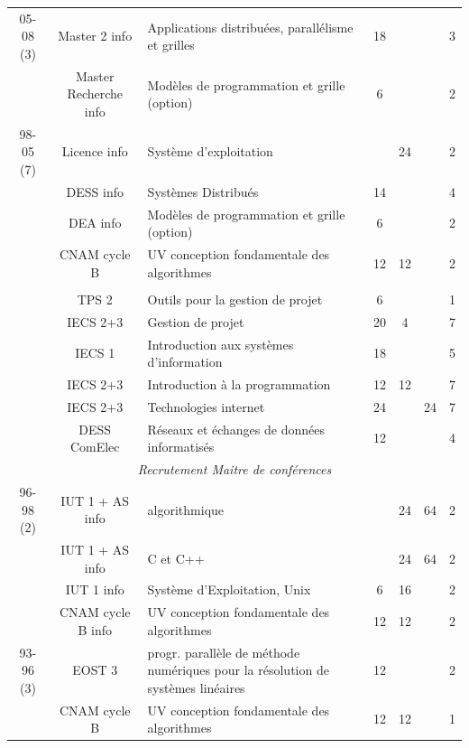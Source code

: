 \documentclass[11pt]{article}
\begin{document}
\begin{table}[H]
\begin{center}
{\begin{tabular}{|c|c|p{6cm}|c|c|c|c|}
\hline
05-08 (3)
	& Master 2 info		& Applications distribuées, parallélisme et grilles	&  18	& & & 3 \\
	& Master Recherche info	& Modèles de programmation et grille (option) 		& 6	& & & 2 \\
\hline
 98-05 (7)
      & Licence info  & Système d'exploitation 	&  	& 24 & 	& 2 \\
	& DESS info	& Systèmes Distribués		& 14	&    &	& 4 \\
	& DEA info	& Modèles de programmation et grille (option) & 6	&    &	& 2 \\
	& CNAM cycle B 		& UV conception fondamentale des algorithmes 			& 12	& 12 &	& 2 \\
&&&&&&	\\
	& TPS 2	        & Outils pour la gestion de projet		& 6	&    &   & 1 \\
	& IECS 2+3	& Gestion de projet				&  20	& 4 &   & 7 \\
	& IECS 1	& Introduction aux systèmes d'information	& 18	&    &  & 5 \\
	& IECS 2+3	& Introduction à la programmation		& 12	& 12   &  & 7 \\
	& IECS 2+3	& Technologies internet				& 24    &    & 24 & 7 \\

	& DESS ComElec	& Réseaux et échanges de données informatisés	& 12	&    &  & 4 \\
\hline
\multicolumn{7}{|c|}{\textit{Recrutement Maitre de conférences}}\\  \hline
96-98 (2)
      & IUT 1 + AS info 		& algorithmique 		&    & 24 & 64   &2\\
      & IUT 1 + AS info			& C et C++ 			&    & 24 & 64   &2\\
      & IUT 1 info                	& Système d'Exploitation, Unix 	& 6  & 16 & 	 &2\\
      & CNAM cycle B info		& UV conception fondamentale des algorithmes 		& 12 & 12 & 	 &2\\
	
\hline
93-96 (3)
      & EOST 3 & progr. parallèle de méthode numériques pour la résolution de systèmes linéaires    &12&& &2    \\
      & CNAM cycle B & UV conception fondamentale des algorithmes & 12 & 12 & 	& 1 \\
\hline


\end{tabular}}
\end{center}
\end{table}
\end{document}

